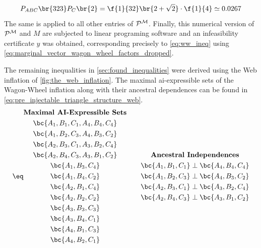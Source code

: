 \documentclass[aps, 10pt, english, twoside, pra, nofootinbib, tightenlines, longbibliography, superscriptaddress]{revtex4-1}
\begin{document}
    \[ \prob[ABC]\br{323}\prob[C]\br{2} = \f{1}{32}\br{2 + \sqrt{2}} \cdot \f{1}{4} \simeq 0.0267  \]
    The same is applied to all other entries of $\probvec^{\mscenario}$. Finally, this numerical version of $\probvec^{\mscenario}$ and $M$ are subjected to linear programing software and an infeasibility certificate $y$ was obtained, corresponding precisely to \cref{eq:ww_ineq} using \cref{eq:marginal_vector_wagon_wheel_factors_dropped}.

    The remaining inequalities in \cref{sec:found_inequalities} were derived using the Web inflation of \cref{fig:the_web_inflation}. The maximal ai-expressible sets of the Wagon-Wheel inflation along with their ancestral dependences can be found in \cref{eq:pre_injectable_triangle_structure_web}.
    \begin{equation*}
        \eq \label{eq:pre_injectable_triangle_structure_web}
        \begin{gathered}
            \textbf{Maximal AI-Expressible Sets} \\
            \bc{A_1, B_1, C_1, A_4, B_4, C_4} \\
            \bc{A_1, B_2, C_3, A_4, B_3, C_2} \\
            \bc{A_2, B_3, C_1, A_3, B_2, C_4} \\
            \bc{A_2, B_4, C_3, A_3, B_1, C_2} \\
            \bc{A_1, B_3, C_4} \\
            \bc{A_1, B_4, C_2} \\
            \bc{A_2, B_1, C_4} \\
            \bc{A_2, B_2, C_2} \\
            \bc{A_3, B_3, C_3} \\
            \bc{A_3, B_4, C_1} \\
            \bc{A_4, B_1, C_3} \\
            \bc{A_4, B_2, C_1}
        \end{gathered}
        \qquad
        \begin{gathered}
            \textbf{Ancestral Independences} \\
            \bc{A_1, B_1, C_1} \ancestralindep \bc{A_4, B_4, C_4} \\
            \bc{A_1, B_2, C_3} \ancestralindep \bc{A_4, B_3, C_2} \\
            \bc{A_2, B_3, C_1} \ancestralindep \bc{A_3, B_2, C_4} \\
            \bc{A_2, B_4, C_3} \ancestralindep \bc{A_3, B_1, C_2} \\

\end{gathered}
\end{equation*}
\end{document}
